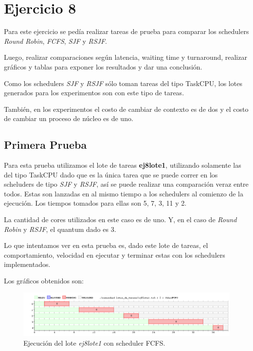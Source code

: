 \section{Ejercicio 8}

Para este ejercicio se pedía realizar tareas de prueba para comparar los schedulers \emph{Round Robin}, \emph{FCFS}, \emph{SJF} y \emph{RSJF}.

Luego, realizar comparaciones según latencia, waiting time y turnaround, realizar gráficos y tablas para exponer los resultados y dar una conclusión.

Como los schedulers \emph{SJF} y \emph{RSJF} sólo toman tareas del tipo TaskCPU, los lotes generados para los experimentos son con este tipo de tareas.

También, en los experimentos el costo de cambiar de contexto es de dos y el costo de cambiar un proceso de núcleo es de uno.

\subsection{Primera Prueba}

Para esta prueba utilizamos el lote de tareas \textbf{ej8lote1}, utilizando solamente las del tipo TaskCPU dado que es la única tarea que se puede correr en los scheluders de tipo \emph{SJF} y \emph{RSJF}, así se puede realizar una comparación veraz entre todos. Estas son lanzadas en al mismo tiempo a los schedulers al comienzo de la ejecución. Los tiempos tomados para ellas son 5, 7, 3, 11 y 2.

La cantidad de cores utilizados en este caso es de uno. Y, en el caso de \emph{Round Robin} y \emph{RSJF}, el quantum dado es 3.

Lo que intentamos ver en esta prueba es, dado este lote de tareas, el comportamiento, velocidad en ejecutar y terminar estas con los schedulers implementados.

Los gráficos obtenidos son:

\begin{figure}[!h]
	\begin{center}
		\includegraphics[width=500px]{imagenes/ej8_prueba1_fcfs.png}
		\caption{Ejecución del lote \emph{ej8lote1} con scheduler FCFS.}
		\label{fig:grafico_ej8_prueba1_fcfs}
	\end{center}
\end{figure}

